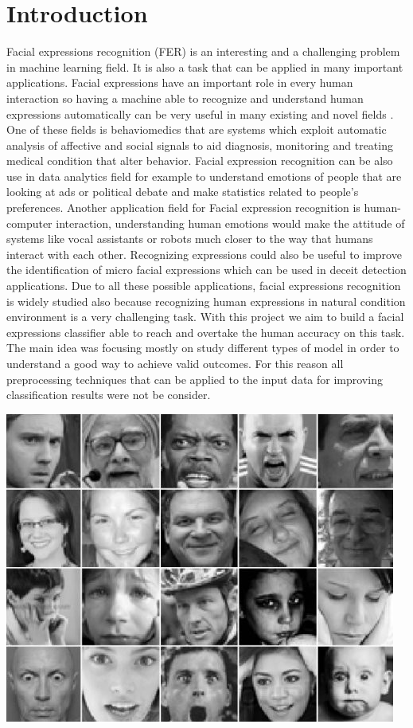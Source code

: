 \documentclass[10pt,twocolumn,letterpaper]{article}
\begin{document}
\section{Introduction}
Facial expressions recognition (FER) is an interesting and a challenging problem
in machine learning field. It is also a task that can be applied in many important applications.
Facial expressions have an important role in every human interaction so having a machine able to
recognize and understand human expressions automatically can be very useful
in many existing and novel fields \cite{2}.
\\One of these fields is behaviomedics that are systems which exploit automatic analysis of affective and social signals
to aid diagnosis, monitoring and treating medical condition that alter behavior.
Facial expression recognition can be also use in data analytics field for example to understand
emotions of people that are looking at ads or political debate and make statistics related to people's preferences.
Another application field for Facial expression recognition is human-computer interaction, understanding human emotions
would make the attitude of systems like vocal assistants or robots much closer to the way that humans interact with each other.
Recognizing expressions could also be useful to improve the identification of micro facial expressions which can be used in
deceit detection applications.
Due to all these possible applications, facial expressions recognition is widely studied also because recognizing
human expressions in natural condition environment is a very challenging task.
With this project we aim to build a facial expressions classifier able to reach and overtake the human accuracy on this task.
The main idea was focusing mostly on study different types of model in order to understand a good way to achieve valid outcomes.
For this reason all preprocessing techniques that can be applied to the input data for improving classification results were not be consider.
\begin{center}
   \includegraphics[width=0.8\linewidth]{./immagini/dataset.jpeg}
\end{center}
\end{document}
